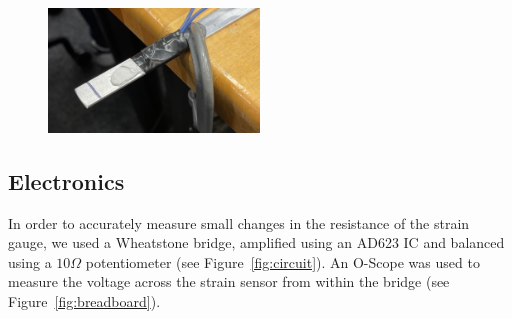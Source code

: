 \documentclass[11pt]{article}
\begin{document}
\begin{figure} [!ht]

	\centering  %
	
	\includegraphics[width=0.5\textwidth]{strain_gauge.jpg}
	
	
	\caption{}
	
	\label{fig:strain_gauge}
\end{figure}

\subsection{Electronics}

In order to accurately measure small changes in the resistance of the strain gauge, we used a Wheatstone bridge, amplified using an AD623 IC and balanced using a $10 \Omega$ potentiometer (see Figure~\ref{fig:circuit}). An O-Scope was used to measure the voltage across the strain sensor from within the bridge (see Figure~\ref{fig:breadboard}).
\end{document}
